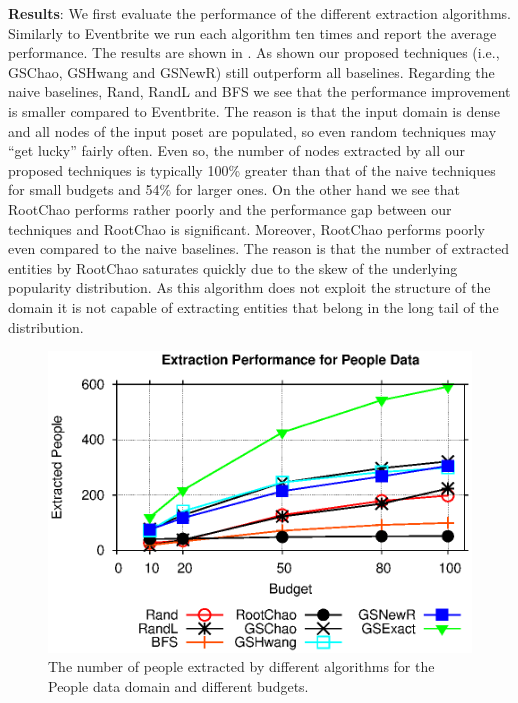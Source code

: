 \vspace{5pt}\noindent\textbf{Results}: We first evaluate the performance of the different extraction algorithms. Similarly to Eventbrite we run each algorithm ten times and report the average performance. The results are shown in . As shown our proposed techniques (i.e., GSChao, GSHwang and GSNewR) still outperform all baselines. Regarding the naive baselines, Rand, RandL and BFS we see that the performance improvement is smaller compared to Eventbrite. The reason is that the input domain is dense and all nodes of the input poset are populated, so even random techniques may ``get lucky'' fairly often. Even so, the number of nodes extracted by all our proposed techniques is typically 100\% greater than that of the naive techniques for small budgets and 54\% for larger ones. On the other hand we see that RootChao performs rather poorly and the performance gap between our techniques and RootChao is significant. Moreover, RootChao performs poorly even compared to the naive baselines. The reason is that the number of extracted entities by RootChao saturates quickly due to the skew of the underlying popularity distribution. As this algorithm does not exploit the structure of the domain it is not capable of extracting entities that belong in the long tail of the distribution.

\begin{figure}[h]
	\vspace{-10pt}
	\begin{center}
	\includegraphics[clip,scale=0.5]{figs/poExtraction.eps}
	\caption{The number of people extracted by different algorithms for the People data domain and different budgets.}
	\label{fig:poextraction}
	\end{center}
	\vspace{-15pt}
\end{figure}

